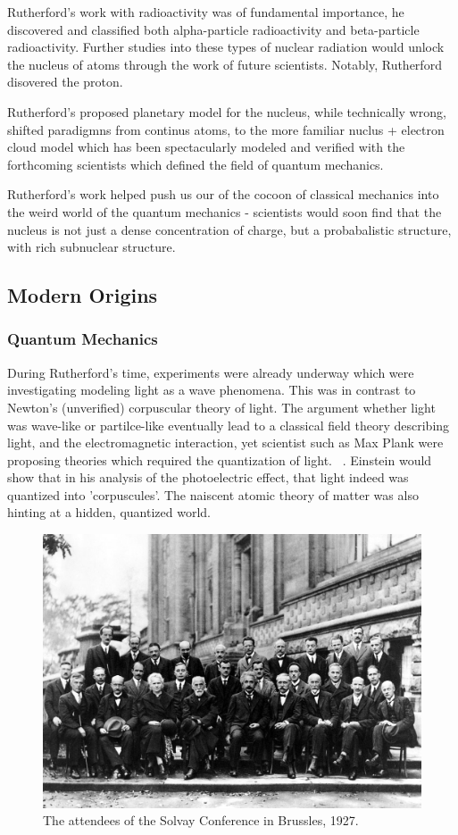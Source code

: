 Rutherford's work with radioactivity was of fundamental importance, he
discovered and classified both alpha-particle radioactivity and beta-particle
radioactivity. Further studies into these types of nuclear radiation would
unlock the nucleus of atoms through the work of future scientists. Notably,
Rutherford disovered the proton.

Rutherford's proposed planetary model for the nucleus, while technically wrong,
shifted paradigmns from continus atoms, to the more familiar nuclus + electron
cloud model which has been spectacularly modeled and verified with the
forthcoming scientists which defined the field of quantum mechanics.

Rutherford's work helped push us our of the cocoon of classical mechanics into
the weird world of the quantum mechanics - scientists would soon find that the
nucleus is not just a dense concentration of charge, but a probabalistic
structure, with rich subnuclear structure.

\subsection{Modern Origins}

\subsubsection{Quantum Mechanics}

During Rutherford's time, experiments were already underway which were
investigating modeling light as a wave phenomena. This was in contrast to
Newton's (unverified) corpuscular theory of light. The argument whether light
was wave-like or partilce-like eventually lead to a classical field theory
describing light, and the electromagnetic interaction, yet scientist such as Max
Plank were proposing theories which required the quantization of light.
~\needcite{}. Einstein would show that in his analysis of the photoelectric
effect, that light indeed was quantized into 'corpuscules'. The naiscent atomic
theory of matter was also hinting at a hidden, quantized world.

\begin{figure}
	\centering
	\includegraphics[width=0.7\linewidth]{../Chapter2/fig/solvay.jpg}
	\caption{
		The attendees of the Solvay Conference in Brussles, 1927.
	}
	\label{fig:solvay}
\end{figure}


